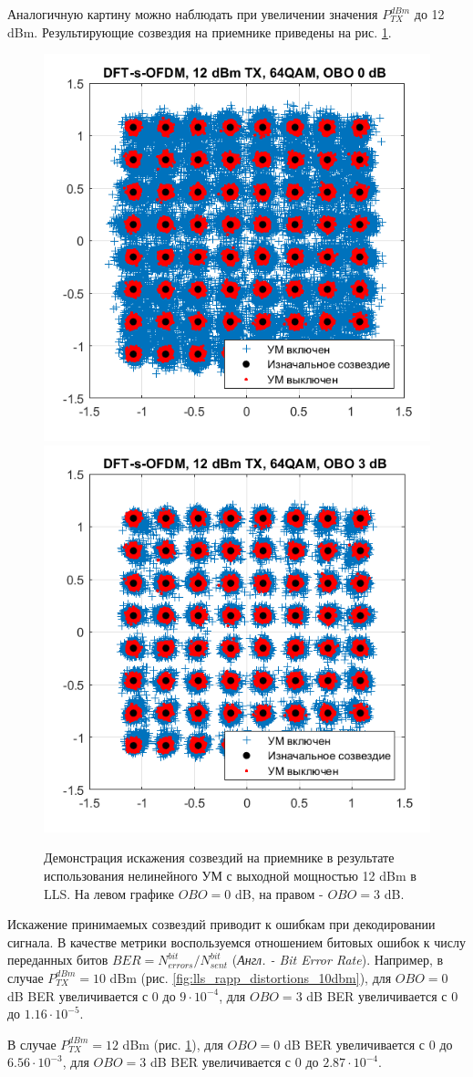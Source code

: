Аналогичную картину можно наблюдать при увеличении значения
$P^{dBm}_{TX}$ до 12 dBm. Результирующие созвездия на приемнике приведены
на рис. \ref{fig:lls_rapp_distortions_12dbm}. 

\begin{figure}[h!]
    \centering
    \includegraphics[width=0.49\linewidth]{figs/dfts_12dbm_obo0.png}
    \includegraphics[width=0.49\linewidth]{figs/dfts_12dbm_obo3.png}
    \caption{Демонстрация искажения созвездий на приемнике в результате
    использования нелинейного УМ с выходной мощностью 12 dBm в LLS. На левом
    графике $OBO=0$ dB, на правом - $OBO=3$ dB.}
    \label{fig:lls_rapp_distortions_12dbm}
\end{figure}

Искажение принимаемых созвездий приводит к ошибкам при декодировании
сигнала. В качестве метрики воспользуемся отношением битовых ошибок к числу
переданных битов $ BER = N^{bit}_{errors}/N^{bit}_{sent}$ (\textit{Англ. - Bit
Error Rate}). Например, в случае $P^{dBm}_{TX}=10$ dBm (рис.
\ref{fig:lls_rapp_distortions_10dbm}), для $OBO=0$ dB BER увеличивается с 0
до $9\cdot 10^{-4}$, для $OBO=3$ dB BER увеличивается с 0 до $1.16\cdot
10^{-5}$. 

В случае $P^{dBm}_{TX}=12$ dBm
(рис. \ref{fig:lls_rapp_distortions_12dbm}), для $OBO=0$ dB BER
увеличивается с 0 до $6.56\cdot 10^{-3}$, для $OBO=3$ dB BER
увеличивается с 0 до $2.87\cdot 10^{-4}$. 

